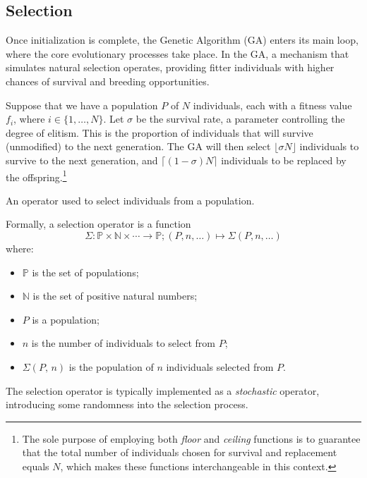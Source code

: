 \subsection{Selection}
\label{sec:genetic_algorithms:selection}
  Once initialization is complete, the Genetic Algorithm (GA) enters its main loop, where the core 
  evolutionary processes take place.
  In the GA, a mechanism that simulates natural selection operates, providing fitter individuals 
  with higher chances of survival and breeding opportunities.

  Suppose that we have a population \(P\) of \(N\) individuals, each with a fitness value \(f_i\), 
  where \(i \in \{1, \ldots, N\}\).
  Let \(\sigma\) be the survival rate, a parameter controlling the degree of elitism.
  This is the proportion of individuals that will survive (unmodified) to the next generation.
  The GA will then select \(\lfloor\sigma N\rfloor\) individuals to survive to the next generation,
  and \(\lceil(1 - \sigma)N\rceil\) individuals to be replaced by the offspring.\footnote{
    The sole purpose of employing both \textit{floor} and \textit{ceiling} functions is to guarantee
    that the total number of individuals chosen for survival and replacement equals \(N\), which
    makes these functions interchangeable in this context.
  }

  \begin{Definition}
    \label{def:selection_operator}
      An operator used to select individuals from a population.

      Formally, a selection operator is a function 
      \[
        \Sigma : \mathbb{P} \times \mathbb{N} \times \cdots \to \mathbb{P};
        (P, n, \dots) \mapsto \Sigma(P, n, \dots)
      \]
      where: 
      
      \begin{itemize}
        \item \(\mathbb{P}\) is the set of populations;
        \item \(\mathbb{N}\) is the set of positive natural numbers;
        \item \(P\) is a population;
        \item \(n\) is the number of individuals to select from \(P\);
        \item \(\Sigma(P,\, n)\) is the population of \(n\) individuals selected from \(P\).
      \end{itemize}
  \end{Definition}

  The selection operator is typically implemented as a \emph{stochastic} operator, introducing some 
  randomness into the selection process.

